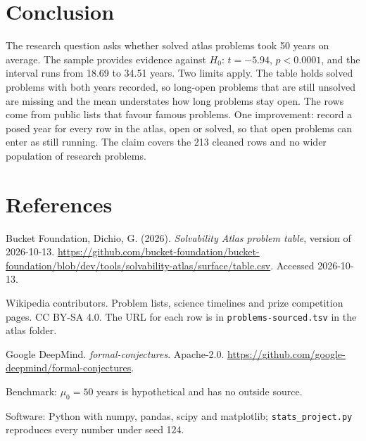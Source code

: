 \documentclass[11pt]{article}
\begin{document}
\section*{Conclusion}
\noindent{}

\medskip
The research question asks whether solved atlas problems took 50 years on average. The sample provides evidence against $H_0$: $t = -5.94$, $p < 0.0001$, and the interval runs from 18.69 to 34.51 years. Two limits apply. The table holds solved problems with both years recorded, so long-open problems that are still unsolved are missing and the mean understates how long problems stay open. The rows come from public lists that favour famous problems. One improvement: record a posed year for every row in the atlas, open or solved, so that open problems can enter as still running. The claim covers the 213 cleaned rows and no wider population of research problems.


\section*{References}

Bucket Foundation, Dichio, G. (2026). \emph{Solvability Atlas problem table}, version of 2026-10-13. \url{https://github.com/bucket-foundation/bucket-foundation/blob/dev/tools/solvability-atlas/surface/table.csv}. Accessed 2026-10-13.

Wikipedia contributors. Problem lists, science timelines and prize competition pages. CC BY-SA 4.0. The URL for each row is in \texttt{problems-sourced.tsv} in the atlas folder.

Google DeepMind. \emph{formal-conjectures}. Apache-2.0. \url{https://github.com/google-deepmind/formal-conjectures}.

Benchmark: $\mu_0 = 50$ years is hypothetical and has no outside source.

Software: Python with numpy, pandas, scipy and matplotlib; \texttt{stats\_project.py} reproduces every number under seed 124.
\end{document}
